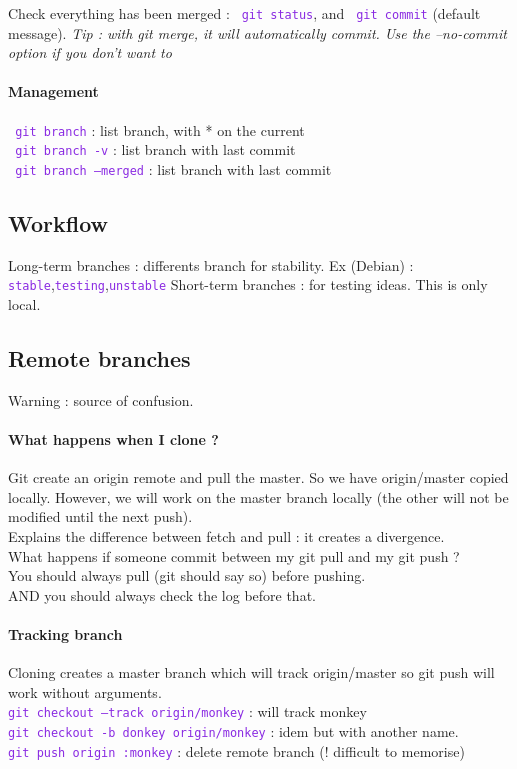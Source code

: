\documentclass{article}
\def\cmd#1{\texttt{\textcolor{blueviolet}{#1}}}
\begin{document}
Check everything has been merged : \cmd{ git status}, and \cmd{ git commit}
(default message).
{\it Tip : with git merge, it will automatically commit. Use the --no-commit
option if you don't want to}

\paragraph{Management}
\cmd{ git branch} : list branch, with * on the current \\
\cmd{ git branch -v} : list branch with last commit \\
\cmd{ git branch --merged} : list branch with last commit \\

\subsection{Workflow}
Long-term branches : differents branch for stability. Ex (Debian) : \cmd{stable},\cmd{testing},\cmd{unstable}
Short-term branches : for testing ideas. This is only local.

\subsection{Remote branches}
Warning : source of confusion.\\
\paragraph{What happens when I clone ?} Git create an origin remote and pull the master. So
we have origin/master copied locally. However, we will work on the master branch
locally (the other will not be modified until the next push).\\
Explains the difference between fetch and pull : it creates a divergence.\\
What happens if someone commit between my git pull and my git push ?\\
You should always pull (git should say so) before pushing.\\
AND you should always check the log before that.

\paragraph{Tracking branch}
Cloning creates a master branch which will track origin/master so git push will
work without arguments.\\
\cmd{git checkout --track origin/monkey} : will track monkey\\
\cmd{git checkout -b donkey origin/monkey} : idem but with another name.\\
\cmd{git push origin :monkey} : delete remote branch (! difficult to memorise)
\end{document}
